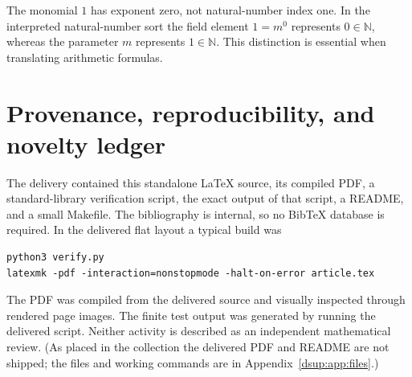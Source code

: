 \documentclass[11pt,oneside]{article}
\numberwithin{equation}{section}
\theoremstyle{definition}
\theoremstyle{remark}
\newcommand{\N}{\mathbb N}
\begin{document}
The monomial $1$ has exponent zero, not natural-number index one. In the
interpreted natural-number sort the field element $1=m^0$ represents
$0\in\N$, whereas the parameter $m$ represents $1\in\N$.
This distinction is essential when translating arithmetic formulas.

\section{Provenance, reproducibility, and novelty ledger}\label{dsup:app:provenance}

The delivery contained this standalone \LaTeX{} source, its compiled PDF,
a standard-library verification script, the exact output of that script,
a README, and a small Makefile. The bibliography is internal, so no
Bib\TeX{} database is required. In the delivered flat layout a typical
build was
\begin{lstlisting}
python3 verify.py
latexmk -pdf -interaction=nonstopmode -halt-on-error article.tex
\end{lstlisting}
The PDF was compiled from the delivered source and visually inspected
through rendered page images. The finite test output was generated by
running the delivered script. Neither activity is described as an
independent mathematical review. (As placed in the collection the delivered
PDF and README are not shipped; the files and working commands are in
Appendix~\ref{dsup:app:files}.)
\end{document}
